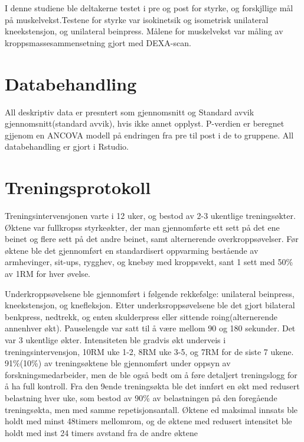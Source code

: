 \documentclass[
]{book}
\begin{document}
I denne studiene ble deltakerne testet i pre og post for styrke, og forskjllige mål på muskelvekst.Testene for styrke var isokinetsik og isometrisk unilateral kneekstensjon, og unilateral beinpress. Målene for muskelvekst var måling av kroppsmassesammensetning gjort med DEXA-scan.

\hypertarget{databehandling}{%
\section{Databehandling}\label{databehandling}}

All deskriptiv data er presntert som gjennomsnitt og Standard avvik gjennomsnitt(standard avvik), hvis ikke annet opplyst. P-verdien er beregnet gjjenom en ANCOVA modell på endringen fra pre til post i de to gruppene. All databehandling er gjort i Rstudio.

\hypertarget{treningsprotokoll}{%
\section{Treningsprotokoll}\label{treningsprotokoll}}

Treningsintervensjonen varte i 12 uker, og bestod av 2-3 ukentlige treningsøkter. Øktene var fullkropss styrkeøkter, der man gjennomførte ett sett på det ene beinet og flere sett på det andre beinet, samt alternerende overkroppsøvelser. Før øktene ble det gjennomført en standardisert oppvarming bestående av armhevinger, sit-ups, rygghev, og knebøy med kroppsvekt, sant 1 sett med 50\% av 1RM for hver øvelse.

Underkroppsøvelsene ble gjennomført i følgende rekkefølge: unilateral beinpress, kneekstensjon, og knefleksjon. Etter underksroppsøvelsene ble det gjort bilateral benkpress, nedtrekk, og enten skulderpress eller sittende roing(alternerende annenhver økt). Pauselengde var satt til å være mellom 90 og 180 sekunder. Det var 3 ukentlige økter. Intensiteten ble gradvis økt underveis i treningsintervensjon, 10RM uke 1-2, 8RM uke 3-5, og 7RM for de siste 7 ukene. 91\%(10\%) av treningsøktene ble gjennomført under oppsyn av forskningsmedarbeider, men de ble også bedt om å føre detaljert treningslogg for å ha full kontroll. Fra den 9ende treningsøkta ble det innført en økt med redusert belastning hver uke, som bestod av 90\% av belastningen på den foregående treningsøkta, men med samme repetisjonsantall. Øktene ed maksimal innsats ble holdt med minst 48timers mellomrom, og de øktene med redusert intensitet ble holdt med inst 24 timers avstand fra de andre øktene
\end{document}
